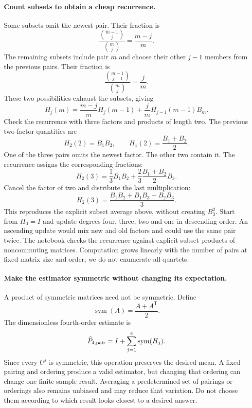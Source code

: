 \documentclass[11pt]{article}
\begin{document}
\paragraph{Count subsets to obtain a cheap recurrence.}
Some subsets omit the newest pair. Their fraction is
\begin{equation}
 \frac{\binom{m-1}{j}}{\binom mj}=\frac{m-j}{m}.
\end{equation}
The remaining subsets include pair $m$ and choose their other $j-1$ members
from the previous pairs. Their fraction is
\begin{equation}
 \frac{\binom{m-1}{j-1}}{\binom mj}=\frac jm.
\end{equation}
These two possibilities exhaust the subsets, giving
\begin{equation}
 H_j(m)=\frac{m-j}{m}H_j(m-1)
       +\frac jm H_{j-1}(m-1)B_m.
 \label{eq:pair-recurrence}
\end{equation}
Check the recurrence with three factors and products of length two.
The previous two-factor quantities are
\begin{equation}
 H_2(2)=B_1B_2,\qquad H_1(2)=\frac{B_1+B_2}{2}.
\end{equation}
One of the three pairs omits the newest factor. The other two contain it.
The recurrence assigns the corresponding fractions:
\begin{equation}
 H_2(3)=\frac13B_1B_2+\frac23\frac{B_1+B_2}{2}B_3.
\end{equation}
Cancel the factor of two and distribute the last multiplication:
\begin{equation}
 H_2(3)=\frac{B_1B_2+B_1B_3+B_2B_3}{3}.
\end{equation}
This reproduces the explicit subset average above, without creating
$B_3^2$. Start from $H_0=I$ and update degrees four, three, two and one
in descending order. An ascending update would mix new and old factors and could use the
same pair twice. The notebook checks the recurrence against explicit subset
products of noncommuting matrices. Computation grows linearly with the number
of pairs at fixed matrix size and order; we do not enumerate all quartets.

\paragraph{Make the estimator symmetric without changing its expectation.}
A product of symmetric matrices need not be symmetric. Define
\begin{equation}
 \operatorname{sym}(A)=\frac{A+A^{\mathsf T}}2.
\end{equation}
The dimensionless fourth-order estimate is
\begin{equation}
 \widehat P_{4,\rm pair}
 =I+\sum_{j=1}^{4}\operatorname{sym}(H_j).
\end{equation}
Since every $U^j$ is symmetric, this operation preserves the desired mean.
A fixed pairing and ordering produce a valid estimator, but changing that
ordering can change one finite-sample result. Averaging a predetermined set
of pairings or orderings also remains unbiased and may reduce that variation.
Do not choose them according to which result looks closest to a desired answer.
\end{document}
